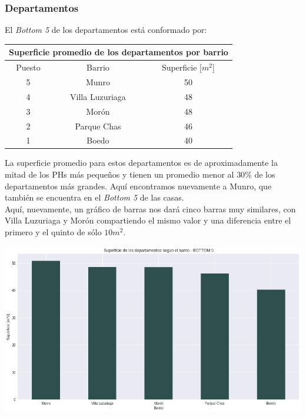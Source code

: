 \documentclass[a4paper, 10pt]{article}
\newcommand\tab[1][0.5cm]{\hspace*{#1}}
\begin{document}
        \subsubsection{Departamentos}
          El \emph{Bottom 5} de los departamentos está conformado por:
          \begin{center}
            \begin{tabular}{ |c|c|c| }
              \hline
              \multicolumn{3}{|c|}{Superficie promedio de los departamentos por barrio}\\
              \hline
              \hline
              Puesto & Barrio & Superficie [$m^2$]\\
              \hline
              5 & Munro & 50\\
              4 & Villa Luzuriaga & 48\\
              3 & Morón & 48\\
              2 & Parque Chas & 46\\
              1 & Boedo & 40\\
              \hline
            \end{tabular}
          \end{center}
          \tab La superficie promedio para estos departamentos es de aproximadamente la mitad de los PHs más pequeños
          y tienen un promedio menor al $30\%$ de los departamentos más grandes. Aquí encontramos nuevamente a Munro, que
          también se encuentra en el \emph{Bottom 5} de las casas. \\
          \tab Aquí, nuevamente, un gráfico de barras nos dará cinco barras muy similares, con Villa Luzuriaga y Morón
          compartiendo el mismo valor y una diferencia entre el primero y el quinto de sólo  $10m^2$.
          \begin{center}
                  \includegraphics[width=\textwidth]{images/apartmentSurfaceBottomBar}
            \end{center}
\end{document}
